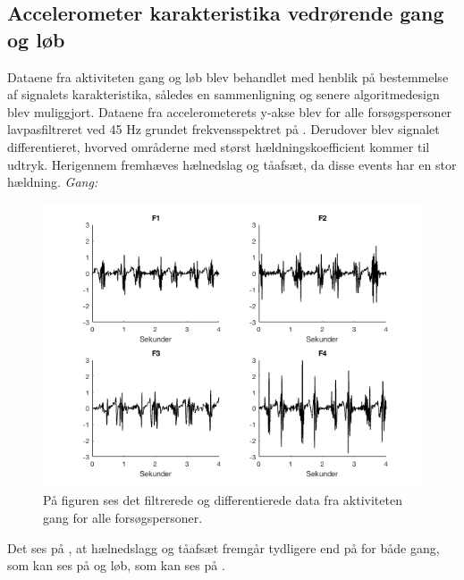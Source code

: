 \subsection{Accelerometer karakteristika vedrørende gang og løb}
Dataene fra aktiviteten gang og løb blev behandlet med henblik på bestemmelse af signalets karakteristika, således en sammenligning og senere algoritmedesign blev muliggjort. Dataene fra accelerometerets y-akse blev for alle forsøgspersoner lavpasfiltreret ved 45 Hz grundet frekvensspektret på . Derudover blev signalet differentieret, hvorved områderne med størst hældningskoefficient kommer til udtryk. Herigennem fremhæves hælnedslag og tåafsæt, da disse events har en stor hældning.
\textit{Gang:}
\begin{figure}[H]
	\centering
	\includegraphics[scale=0.6]{figures/qBilag/gang_diff}
	\caption{På figuren ses det filtrerede og differentierede data fra aktiviteten gang for alle forsøgspersoner.}
	\label{fig:Ap_gangdiff}
\end{figure}
Det ses på , at hælnedslagg og tåafsæt fremgår tydligere end på  for både gang, som kan ses på  og løb, som kan ses på .
